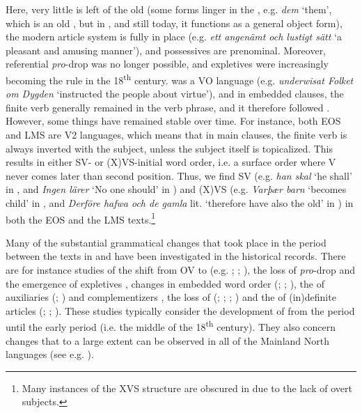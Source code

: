 \documentclass[output=paper]{langscibook}
\begin{document}
Here, very little is left of the old  (some forms linger in the , e.g. \textit{dem} ‘them’, which is an old , but in , and still today, it functions as a general object form), the modern article system is fully in place (e.g. \textit{ett angenämt och lustigt sätt} ‘a pleasant and amusing manner’), and possessives are prenominal. Moreover, referential \textit{pro}{}-drop was no longer possible, and expletives were increasingly becoming the rule in the 18\textsuperscript{th} century.  was a VO language (e.g. \textit{underwisat Folket om Dygden} ‘instructed the people about virtue’), and in embedded clauses, the finite verb generally remained in the verb phrase, and it therefore followed . However, some things have remained stable over time. For instance, both EOS and LMS are V2 languages, which means that in main clauses, the finite verb is always inverted with the subject, unless the subject itself is topicalized. This results in either SV- or (X)VS-initial word order, i.e. a surface order where V never comes later than second position. Thus, we find SV (e.g. \textit{han skal} ‘he shall’ in , and \textit{Ingen lärer} ‘No one should’ in ) and (X)VS (e.g. \textit{Varþær barn} ‘becomes child’ in , and \textit{Derföre hafwa och de gamla} lit. ‘therefore have also the old’ in ) in both the EOS and the LMS texts.\footnote{Many instances of the XVS structure are obscured in  due to the lack of overt subjects.}



Many of the substantial grammatical changes that took place in the period between the texts in  and  have been investigated in the historical records. There are for instance studies of the shift from OV to  (e.g. \citealt{Delsing1999}; \citealt{Petzell2011}; \citealt{Sangfelt2019}), the loss of \textit{pro}{}-drop \citep{Hakansson2008} and the emergence of expletives \citep{Falk1993}, changes in embedded word order (\citealt{Platzack1988centralskandinaviska}; \citealt{Falk1993}; \citealt{Hakansson2011}), the  of auxiliaries (\citealt{Andersson2007}; \citealt{Bylin2013}) and complementizers \citep{Rosenkvist2004}, the loss of  (\citealt{Delsing1991,Delsing2014Studier,Delsing1991}; \citealt{Norde1997}; \citealt{Falk1997}; \citealt{Skrzypek2005}) and the  of (in)definite articles (\citealt{Skrzypek2009}; \citealt{BrandtlerDelsing2010}; \citealt{Stroh-Wollin2016}). These studies typically consider the development of  from the  period until the early  period (i.e. the middle of the 18\textsuperscript{th} century). They also concern changes that to a large extent can be observed in all of the Mainland North  languages (see e.g. \citealt{HolmbergPlatzack1995}).
\end{document}
